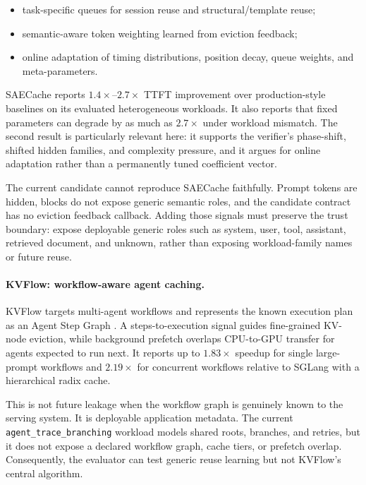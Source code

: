 \documentclass[11pt]{article}
\newcommand{\identifier}[1]{\nolinkurl{#1}}
\begin{document}
\begin{itemize}
  \item task-specific queues for session reuse and structural/template reuse;
  \item semantic-aware token weighting learned from eviction feedback;
  \item online adaptation of timing distributions, position decay, queue weights, and
  meta-parameters.
\end{itemize}

SAECache reports \(1.4\times\)--\(2.7\times\) TTFT improvement over production-style
baselines on its evaluated heterogeneous workloads.  It also reports that fixed
parameters can degrade by as much as \(2.7\times\) under workload mismatch.  The second
result is particularly relevant here: it supports the verifier's phase-shift, shifted
hidden families, and complexity pressure, and it argues for online adaptation rather
than a permanently tuned coefficient vector.

The current candidate cannot reproduce SAECache faithfully.  Prompt tokens are hidden,
blocks do not expose generic semantic roles, and the candidate contract has no eviction
feedback callback.  Adding those signals must preserve the trust boundary: expose
deployable generic roles such as system, user, tool, assistant, retrieved document, and
unknown, rather than exposing workload-family names or future reuse.

\paragraph{KVFlow: workflow-aware agent caching.}
KVFlow targets multi-agent workflows and represents the known execution plan as an Agent
Step Graph \cite{kvflow}.  A steps-to-execution signal guides fine-grained KV-node
eviction, while background prefetch overlaps CPU-to-GPU transfer for agents expected to
run next.  It reports up to \(1.83\times\) speedup for single large-prompt workflows and
\(2.19\times\) for concurrent workflows relative to SGLang with a hierarchical radix
cache.

This is not future leakage when the workflow graph is genuinely known to the serving
system.  It is deployable application metadata.  The current
\identifier{agent_trace_branching} workload models shared roots, branches, and retries,
but it does not expose a declared workflow graph, cache tiers, or prefetch overlap.
Consequently, the evaluator can test generic reuse learning but not KVFlow's central
algorithm.
\end{document}
